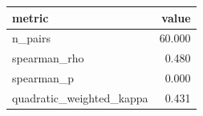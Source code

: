 \begin{tabular}{lr}
\toprule
metric & value \\
\midrule
n_pairs & 60.000 \\
spearman_rho & 0.480 \\
spearman_p & 0.000 \\
quadratic_weighted_kappa & 0.431 \\
\bottomrule
\end{tabular}
